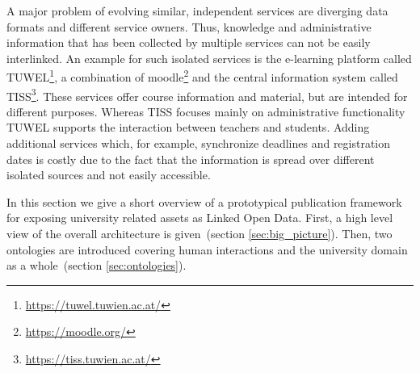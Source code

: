 \documentclass{article}
\begin{document}
A major problem of evolving similar, independent services are diverging data formats and different service owners. Thus, knowledge and administrative information that has been collected by multiple services can not be easily interlinked. An example for such isolated services is the e-learning platform called TUWEL\footnote{\url{https://tuwel.tuwien.ac.at/}}, a combination of moodle\footnote{\url{https://moodle.org/}} and the central information system called TISS\footnote{\url{https://tiss.tuwien.ac.at/}}. These services offer course information and material, but are intended for different purposes. Whereas TISS focuses mainly on administrative functionality TUWEL supports the interaction between teachers and students. 
Adding additional services which, for example, synchronize deadlines and registration dates is costly due to the fact that the information is spread over different isolated sources and not easily accessible. 

In this section we give a short overview of a prototypical publication framework for exposing university related assets as Linked Open Data. First, a high level view of the overall architecture is given~(section \ref{sec:big_picture}). Then, two ontologies are introduced covering human interactions and the university domain as a whole~(section \ref{sec:ontologies}). 
\end{document}
